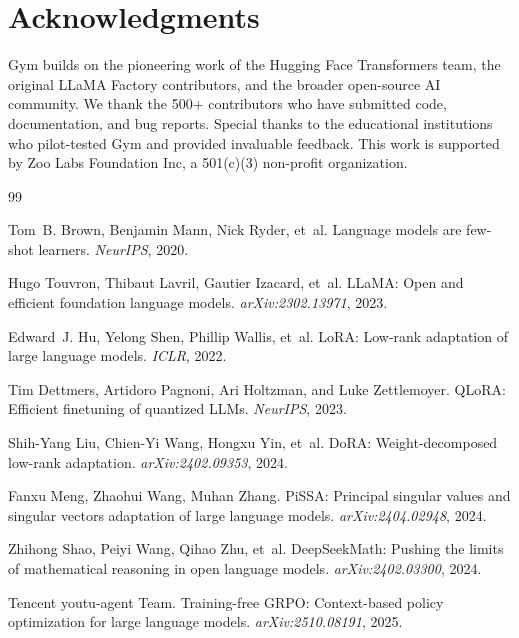 \section*{Acknowledgments}


Gym builds on the pioneering work of the Hugging Face Transformers team, the original LLaMA Factory contributors, and the broader open-source AI community. We thank the 500+ contributors who have submitted code, documentation, and bug reports. Special thanks to the educational institutions who pilot-tested Gym and provided invaluable feedback. This work is supported by Zoo Labs Foundation Inc, a 501(c)(3) non-profit organization.


\begin{thebibliography}{99}

Tom~B. Brown, Benjamin Mann, Nick Ryder, et~al.
\newblock Language models are few-shot learners.
\newblock \emph{NeurIPS}, 2020.

Hugo Touvron, Thibaut Lavril, Gautier Izacard, et~al.
\newblock LLaMA: Open and efficient foundation language models.
\newblock \emph{arXiv:2302.13971}, 2023.

Edward~J. Hu, Yelong Shen, Phillip Wallis, et~al.
\newblock LoRA: Low-rank adaptation of large language models.
\newblock \emph{ICLR}, 2022.

Tim Dettmers, Artidoro Pagnoni, Ari Holtzman, and Luke Zettlemoyer.
\newblock QLoRA: Efficient finetuning of quantized LLMs.
\newblock \emph{NeurIPS}, 2023.

Shih-Yang Liu, Chien-Yi Wang, Hongxu Yin, et~al.
\newblock DoRA: Weight-decomposed low-rank adaptation.
\newblock \emph{arXiv:2402.09353}, 2024.

Fanxu Meng, Zhaohui Wang, Muhan Zhang.
\newblock PiSSA: Principal singular values and singular vectors adaptation of large language models.
\newblock \emph{arXiv:2404.02948}, 2024.

Zhihong Shao, Peiyi Wang, Qihao Zhu, et~al.
\newblock DeepSeekMath: Pushing the limits of mathematical reasoning in open language models.
\newblock \emph{arXiv:2402.03300}, 2024.

Tencent youtu-agent Team.
\newblock Training-free GRPO: Context-based policy optimization for large language models.
\newblock \emph{arXiv:2510.08191}, 2025.


\end{thebibliography}
